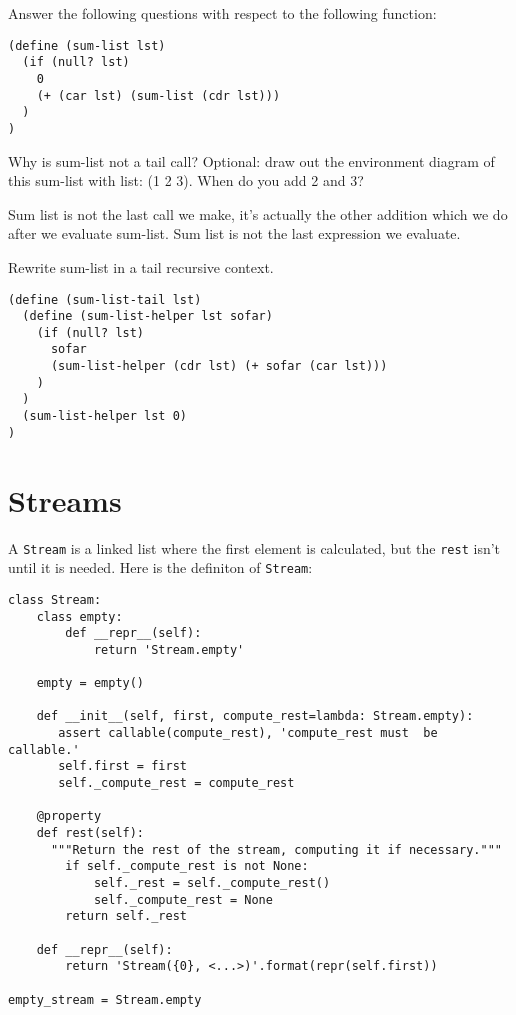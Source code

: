 \documentclass{exam}
\begin{document}
\begin{questions}
Answer the following questions with respect to the following function:
\begin{lstlisting}
(define (sum-list lst)
  (if (null? lst)
    0
    (+ (car lst) (sum-list (cdr lst)))
  )
)
\end{lstlisting}
\question Why is sum-list not a tail call? Optional: draw out the environment diagram of this sum-list with list: (1 2 3). When do you add 2 and 3?
\begin{solution}[0.5in]
Sum list is not the last call we make, it’s actually the other addition which we do after we evaluate sum-list. Sum list is not the last expression we evaluate.
\end{solution}
\question Rewrite sum-list in a tail recursive context.
\begin{solution}[0.5in]
\begin{lstlisting}
(define (sum-list-tail lst)
  (define (sum-list-helper lst sofar)
    (if (null? lst)
      sofar
      (sum-list-helper (cdr lst) (+ sofar (car lst)))
    )
  )
  (sum-list-helper lst 0)
)
\end{lstlisting}
\end{solution}

\end{questions}

\section{Streams}
A \texttt{Stream} is a linked list where the first element is calculated, but the
 \texttt{rest} isn’t until it is needed. Here is the definiton of \texttt{Stream}:

\begin{lstlisting}
class Stream:
    class empty:
        def __repr__(self):
            return 'Stream.empty'

    empty = empty()

    def __init__(self, first, compute_rest=lambda: Stream.empty):
       assert callable(compute_rest), 'compute_rest must  be callable.'
       self.first = first
       self._compute_rest = compute_rest

    @property
    def rest(self):
      """Return the rest of the stream, computing it if necessary."""
        if self._compute_rest is not None:
            self._rest = self._compute_rest()
            self._compute_rest = None
        return self._rest

    def __repr__(self):
        return 'Stream({0}, <...>)'.format(repr(self.first))

empty_stream = Stream.empty
\end{lstlisting}
\end{document}
